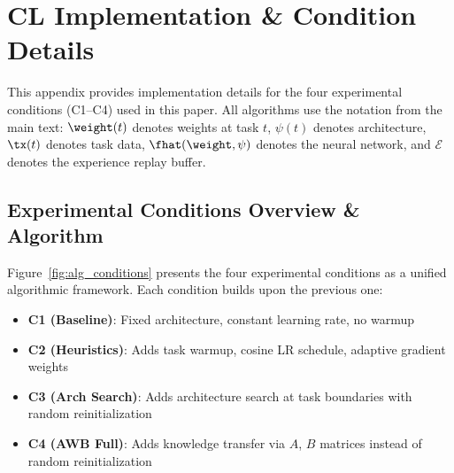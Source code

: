\section{CL Implementation \& Condition Details}
\label{app:standard_cl}

This appendix provides implementation details for the four experimental conditions (C1--C4) used in this paper. All algorithms use the notation from the main text: $\weight(t)$ denotes weights at task $t$, $\psi(t)$ denotes architecture, $\tx(t)$ denotes task data, $\fhat(\weight,\psi)$ denotes the neural network, and $\mathcal{E}$ denotes the experience replay buffer.


\subsection{Experimental Conditions Overview \& Algorithm}

Figure~\ref{fig:alg_conditions} presents the four experimental conditions as a unified algorithmic framework. Each condition builds upon the previous one:
\begin{itemize}
    \item \textbf{C1 (Baseline)}: Fixed architecture, constant learning rate, no warmup
    \item \textbf{C2 (Heuristics)}: Adds task warmup, cosine LR schedule, adaptive gradient weights
    \item \textbf{C3 (Arch Search)}: Adds architecture search at task boundaries with random reinitialization
    \item \textbf{C4 (AWB Full)}: Adds knowledge transfer via $A$, $B$ matrices instead of random reinitialization
\end{itemize}

